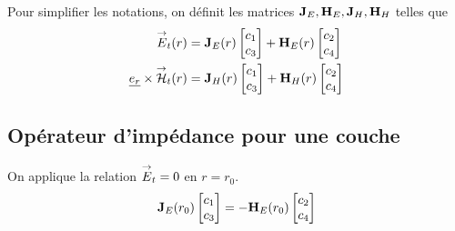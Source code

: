     Pour simplifier les notations, on définit les matrices $\mJ_{E},\mH_{E},\mJ_{H},\mH_{H}$ telles que
    \begin{align}
        \vE_t(r) &= \mJ_{E}(r)
        \begin{bmatrix}
            c_1 \\
            c_3
        \end{bmatrix}
        +
        \mH_{E}(r)
        \begin{bmatrix}
            c_2 \\
            c_4
        \end{bmatrix}
        \\
        \v{e_r}\times\vH_t(r) &= 
        \mJ_{H}(r)
        \begin{bmatrix}
            c_1 \\
            c_3
        \end{bmatrix}
        +
        \mH_{H}(r)
        \begin{bmatrix}
            c_2 \\
            c_4
        \end{bmatrix}
    \end{align}




    \subsection{Opérateur d'impédance pour une couche}

        \begin{figure}[!hbt]
            \centering
            \begin{tikzpicture}
                
            \end{tikzpicture}
        \end{figure}


        On applique la relation $\vE_t = 0$ en $r = r_0$.
        \begin{equation}
            \mJ_{E}(r_0)
            \begin{bmatrix}
                c_1 \\
                c_3
            \end{bmatrix}
            =-\mH_{E}(r_0)
            \begin{bmatrix}
                c_2 \\
                c_4
            \end{bmatrix}
        \end{equation}

